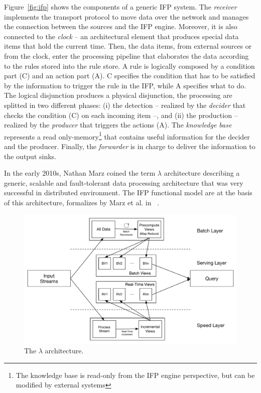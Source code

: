 Figure~\ref{fig:ifp} shows the components of a generic IFP system.
The \textit{receiver} implements the transport protocol to move data over the network and manages the connection between the sources and the IFP engine. Moreover, it is also connected to the \textit{clock} -- an architectural element that produces special data items that hold the current time.
Then, the data items, from external sources or from the clock, enter the processing pipeline that elaborates the data according to the rules stored into the rule store.
A rule is logically composed by a condition part (C) and an action part (A). C specifies the condition that has to be satisfied by the information to trigger the rule in the IFP, while A specifies what to do. The logical disjunction produces a physical disjunction, the processing are splitted in two different phases: (i) the detection -- realized by the \textit{decider} that checks the condition (C) on each incoming item --, and (ii) the production -- realized by the \textit{producer} that triggers the actions (A).
The \textit{knowledge base} represents a read only-memory\footnote{The knowledge base is read-only from the IFP engine perspective, but can be modified by external systems} that contains useful information for the decider and the producer.
Finally, the \textit{forwarder} is in charge to deliver the information to the output sinks.

In the early 2010s, Nathan Marz coined the term $\lambda$ architecture describing a generic, scalable and fault-tolerant data processing architecture that was very successful in distributed environment. 
The IFP functional model are at the basis of this architecture, formalizes by Marz et al. in ~\cite{marz2015big}.

\begin{figure}[t]
  \begin{center}
    \includegraphics[width=\textwidth]{img/lambda-arch}
    \caption{The $\lambda$ architecture.}
    \label{fig:lambda-arch}
  \end{center}
\end{figure}

